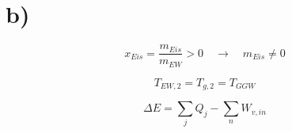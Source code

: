 

\section*{b)}

\[
x_{Eis} = \frac{m_{Eis}}{m_{EW}} > 0 \quad \rightarrow \quad m_{Eis} \neq 0
\]

\[
T_{EW,2} = T_{g,2} = T_{GGW}
\]

\[
\Delta E = \sum_j Q_j - \sum_n W_{v,in}
\]